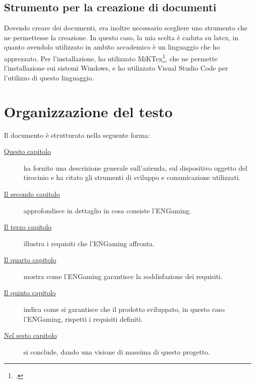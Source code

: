 \subsection{Strumento per la creazione di documenti}
Dovendo creare dei documenti, era inoltre necessario scegliere uno strumento che ne permettesse la creazione. In questo caso, la mia scelta è caduta su \gls{latex}, in quanto avendolo utilizzato in ambito accademico è un linguaggio che ho apprezzato. Per l'installazione, ho utilizzato MiKTex\footcite{site:miktex}, che ne permette l'installazione sui sistemi Windows, e ho utilizzato Visual Studio Code per l'utilizzo di questo linguaggio.

\section{Organizzazione del testo}
Il documento è strutturato nella seguente forma:
\begin{description}
    \item[{\hyperref[cap:introduzione]{Questo capitolo}}] ha fornito una descrizione generale sull'azienda, sul dispositivo oggetto del tirocinio e ha citato gli strumenti di sviluppo e comunicazione utilizzati.
    
    \item[{\hyperref[cap:descrizione-stage]{Il secondo capitolo}}] approfondisce in dettaglio in cosa consiste l'ENGaming.
    
    \item[{\hyperref[cap:analisi-requisiti]{Il terzo capitolo}}] illustra i requisiti che l'ENGaming affronta.
    
    \item[{\hyperref[cap:progettazione-codifica]{Il quarto capitolo}}] mostra come l'ENGaming garantisce la soddisfazione dei requisiti.
    
    \item[{\hyperref[cap:verifica-validazione]{Il quinto capitolo}}] indica come si garantisce che il prodotto sviluppato, in questo caso l'ENGaming, rispetti i requisiti definiti.
    
    \item[{\hyperref[cap:conclusioni]{Nel sesto capitolo}}] si conclude, dando una visione di massima di questo progetto.
\end{description}

